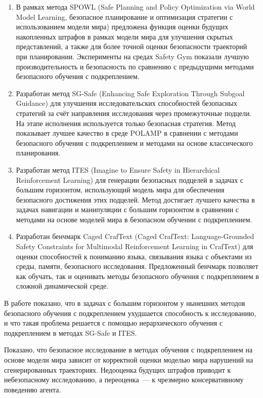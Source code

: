 {\novelty}
\begin{enumerate}[beginpenalty=10000]
  \item В рамках метода SPOWL (Safe Planning and Policy Optimization via World Model Learning, безопасное планирование и оптимизация стратегии с использованием модели мира) предложена функция оценки будущих накопленных штрафов в рамках модели мира для улучшения скрытых представлений, а также для более точной оценки безопасности траекторий при планировании. Эксперименты на средах Safety Gym показали лучшую производительность и безопасность по сравнению с предыдущими методами безопасного обучения с подкреплением.
  \item Разработан метод SG-Safe (Enhancing Safe Exploration Through Subgoal Guidance) для улучшения исследовательских способностей безопасных стратегий за счёт направления исследования через промежуточные подцели. На этапе исполнения используется только безопасная стратегия. Метод показывает лучшее качество в среде POLAMP в сравнении с методами безопасного обучения с подкреплением и методами на основе классического планирования.
  \item Разработан метод ITES (Imagine to Ensure Safety in Hierarchical Reinforcement Learning) для генерации безопасных подцелей в задачах с большим горизонтом, использующий модель мира для обеспечения безопасного достижения этих подцелей. Метод достигает лучшего качества в задачах навигации и манипуляции с большим горизонтом в сравнении с методами на основе моделей мира в безопасном обучении с подкреплением.
  \item Разработан бенчмарк Caged CrafText (Caged CrafText: Language-Grounded Safety Constraints for Multimodal Reinforcement Learning in CrafText) для оценки способностей к пониманию языка, связывания языка с объектами из среды, памяти, безопасного исследования. Предложенный бенчмарк позволяет как обучать, так и оценивать методы безопасного обучения с подкреплением в сложной динамической среде.
\end{enumerate}

{\theory}
В работе показано, что в задачах с большим горизонтом у нынешних методов безопасного обучения с подкреплением ухудшается способность к исследованию, и что такая проблема решается с помощью иерархического обучения с подкреплением в методах SG-Safe и ITES.

Показано, что безопасное исследование в методах обучения с подкреплением на основе модели мира зависит от корректной оценки моделью мира нарушений на сгенерированных траекториях. Недооценка будущих штрафов приводит к небезопасному исследованию, а переоценка~--- к чрезмерно консервативному поведению агента.

